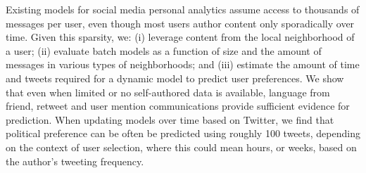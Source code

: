 Existing models for social media personal analytics assume access to thousands of messages per user, even though most users author content only sporadically over time.  Given this sparsity, we: (i) leverage content from the local neighborhood of a user; (ii) evaluate batch models as a function of size and the amount of messages in various types of neighborhoods; and (iii) estimate the amount of time and tweets required for a dynamic model to predict user preferences. We show that even when limited or no self-authored data is available, language from friend, retweet and user mention communications provide sufficient evidence for prediction.  When updating models over time based on Twitter, we find that political preference can be often be predicted using roughly 100 tweets, depending on the context of user selection, where this could mean hours, or weeks, based on the author's tweeting frequency.
